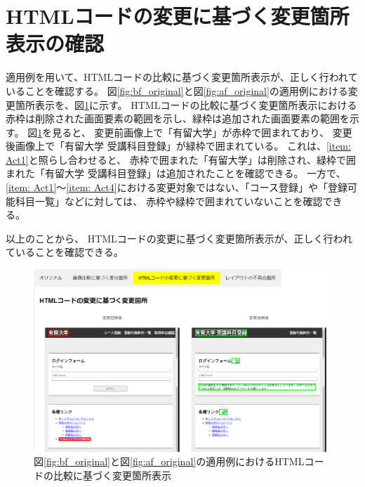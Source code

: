 \section{HTMLコードの変更に基づく変更箇所表示の確認}
適用例を用いて、HTMLコードの比較に基づく変更箇所表示が、正しく行われていることを確認する。
図\ref{fig:bf_original}と図\ref{fig:af_original}の適用例における変更箇所表示を、図\ref{fig: 5_app1}に示す。
HTMLコードの比較に基づく変更箇所表示における赤枠は削除された画面要素の範囲を示し、緑枠は追加された画面要素の範囲を示す。
図\ref{fig: 5_app1}を見ると、
変更前画像上で「有留大学」が赤枠で囲まれており、
変更後画像上で「有留大学 受講科目登録」が緑枠で囲まれている。
これは、\ref{item: Act1}と照らし合わせると、
赤枠で囲まれた「有留大学」は削除され、緑枠で囲まれた「有留大学 受講科目登録」は追加されたことを確認できる。
一方で、\ref{item: Act1}～\ref{item: Act4}における変更対象ではない、「コース登録」や「登録可能科目一覧」などに対しては、
赤枠や緑枠で囲まれていないことを確認できる。
\par
以上のことから、
HTMLコードの変更に基づく変更箇所表示が、正しく行われていることを確認できる。
\begin{figure}[tp]
    \begin{center}
        \includegraphics[width=1.0\columnwidth]{image/5/new_html.png}
        \caption{図\ref{fig:bf_original}と図\ref{fig:af_original}の適用例におけるHTMLコードの比較に基づく変更箇所表示}
        \label{fig: 5_app1}
    \end{center}
\end{figure}


